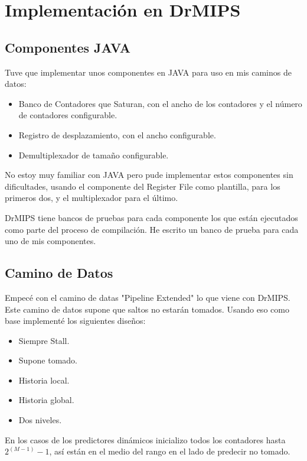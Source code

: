 \documentclass[a4paper]{article}
\begin{document}
\section{Implementación en DrMIPS}

\subsection{Componentes JAVA}

Tuve que implementar unos componentes en JAVA para uso en mis caminos de datos:

\begin{itemize}
    \item Banco de Contadores que Saturan, con el ancho de los contadores y el número de contadores configurable.
    \item Registro de desplazamiento, con el ancho configurable.
    \item Demultiplexador de tamaño configurable.
\end{itemize}

No estoy muy familiar con JAVA pero pude implementar estos componentes sin dificultades, usando el componente del Register File como plantilla, para los primeros dos, y el multiplexador para el último.

DrMIPS tiene bancos de pruebas para cada componente los que están ejecutados como parte del proceso de compilación. He escrito un banco de prueba para cada uno de mis componentes.

\subsection{Camino de Datos}

Empecé con el camino de datas "Pipeline Extended" lo que viene con DrMIPS. Este camino de datos supone que saltos no estarán tomados. Usando eso como base implementé los siguientes diseños:

\begin{itemize}
    \item Siempre Stall.
    \item Supone tomado.
    \item Historia local.
    \item Historia global.
    \item Dos niveles.
\end{itemize}

En los casos de los predictores dinámicos inicializo todos los contadores hasta $2^(M-1) - 1$, así están en el medio del rango en el lado de predecir no tomado.
\end{document}
